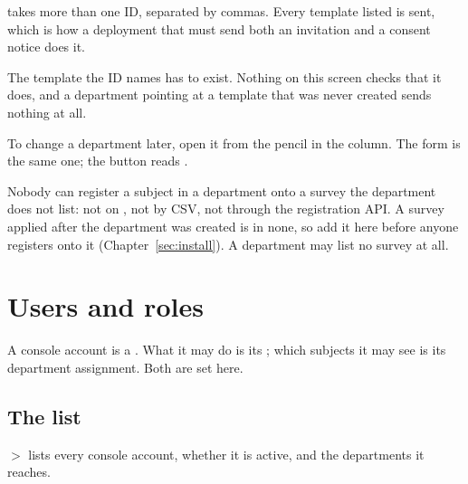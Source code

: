 \documentclass[11pt, a4paper]{article}
\newcommand{\adminonly}{%
  \marginpar{\raggedright\footnotesize\textcolor{elicitVerdigris}{\textsf{Administrator}}}%
}
\begin{document}

\begin{elicitnote}
 takes more than one ID, separated by commas. Every template listed is
sent, which is how a deployment that must send both an invitation and a consent notice does it.
\end{elicitnote}

\begin{elicitcaution}
The template the ID names has to exist. Nothing on this screen checks that it does, and a
department pointing at a template that was never created sends nothing at all.
\end{elicitcaution}

To change a department later, open it from the pencil in the  column. The form is the
same one; the button reads .

\begin{elicitcaution}
Nobody can register a subject in a department onto a survey the department does not list: not on
, not by CSV, not through the registration API. A survey applied after the
department was created is in none, so add it here before anyone registers onto it
(Chapter~\ref{sec:install}). A department may list no survey at all.
\end{elicitcaution}

\section{Users and roles}\adminonly
\label{sec:users}

A console account is a . What it may do is its ; which subjects it may see
is its department assignment. Both are set here.

\subsection{The list}

 $>$  lists every console account, whether it is active, and the departments
it reaches.

\end{document}
